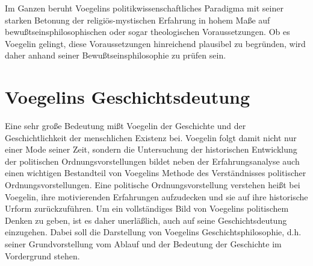 Im Ganzen beruht Voegelins politikwissenschaftliches Paradigma mit seiner
starken Betonung der religiös-mystischen Erfahrung in hohem Maße auf
bewußtseinsphilosophischen oder sogar theologischen Voraussetzungen. Ob es
Voegelin gelingt, diese Voraussetzungen hinreichend plausibel zu begründen,
wird daher anhand seiner Bewußtseinsphilosophie zu prüfen sein. 

\section{Voegelins Geschichtsdeutung}

Eine sehr große Bedeutung mißt Voegelin der Geschichte und der
Geschichtlichkeit der menschlichen Existenz bei. Voegelin folgt damit nicht
nur einer Mode seiner Zeit, sondern die Untersuchung der historischen
Entwicklung der politischen Ordnungsvorstellungen bildet neben der
Erfahrungsanalyse auch einen wichtigen Bestandteil von Voegelins Methode
des Verständnisses politischer Ordnungsvorstellungen. Eine politische
Ordnungsvorstellung verstehen heißt bei Voegelin, ihre motivierenden
Erfahrungen aufzudecken und sie auf ihre historische Urform zurückzuführen. Um
ein vollständiges Bild von Voegelins politischem Denken zu geben, ist es daher
unerläßlich, auch auf seine Geschichtsdeutung einzugehen. Dabei soll die
Darstellung von Voegelins Geschichtsphilosophie, d.h. seiner Grundvorstellung
vom Ablauf und der Bedeutung der Geschichte im Vordergrund stehen.

